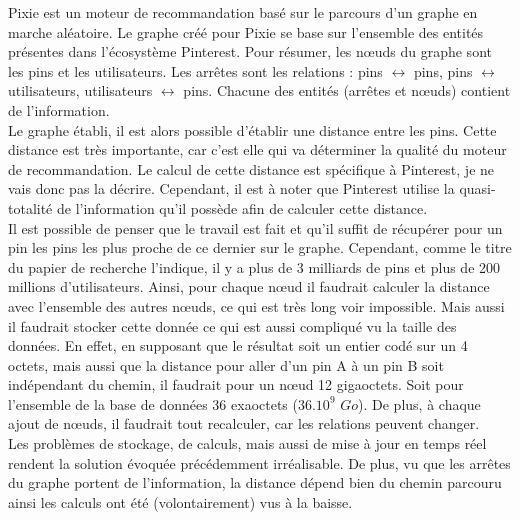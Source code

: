 \documentclass{article} %
\begin{document}
Pixie est un moteur de recommandation basé sur le parcours d'un graphe en marche aléatoire. Le graphe créé pour Pixie se base sur l'ensemble des entités présentes dans l'écosystème Pinterest. Pour résumer, les nœuds du graphe sont les pins et les utilisateurs. Les arrêtes sont les relations : pins $\leftrightarrow$ pins, pins $\leftrightarrow$ utilisateurs, utilisateurs $\leftrightarrow$ pins. Chacune des entités (arrêtes et nœuds) contient de l'information.\\
Le graphe établi, il est alors possible d'établir une distance entre les pins. Cette distance est très importante, car c'est elle qui va déterminer la qualité du moteur de recommandation. Le calcul de cette distance est spécifique à Pinterest, je ne vais donc pas la décrire. Cependant, il est à noter que Pinterest utilise la quasi-totalité de l'information qu'il possède afin de calculer cette distance.\\
Il est possible de penser que le travail est fait et qu'il suffit de récupérer pour un pin les pins les plus proche de ce dernier sur le graphe. Cependant, comme le titre du papier de recherche l'indique, il y a plus de 3 milliards de pins et plus de 200 millions d'utilisateurs. Ainsi, pour chaque nœud il faudrait calculer la distance avec l'ensemble des autres nœuds, ce qui est très long voir impossible. Mais aussi il faudrait stocker cette donnée ce qui est aussi compliqué vu la taille des données. En effet, en supposant que le résultat soit un entier codé sur un 4 octets, mais aussi que la distance pour aller d'un pin A à un pin B soit indépendant du chemin, il faudrait pour un nœud 12 gigaoctets. Soit pour l'ensemble de la base de données 36 exaoctets ($36.10^9$ $Go$). De plus, à chaque ajout de nœuds, il faudrait tout recalculer, car les relations peuvent changer.\\
Les problèmes de stockage, de calculs, mais aussi de mise à jour en temps réel rendent la solution évoquée précédemment irréalisable. De plus, vu que les arrêtes du graphe portent de l'information, la distance dépend bien du chemin parcouru ainsi les calculs ont été (volontairement) vus à la baisse.\\
\end{document}
